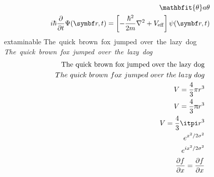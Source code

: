 \begin{align}
\ \mathbfit{\theta} a \theta \\
i\hbar\pdv t \Psi(\vec r, t) = \left[-\frac{\hbar^2}{2m}\nabla^2 + V_{\mathrm{eff}}\right]\psi(\vec r, t)
\end{align}
extaminable
The\ quick\ brown\ fox\ jumped\ over\ the\ lazy\ dog
\emph{The\ quick\ brown\ fox\ jumped\ over\ the\ lazy\ dog}
\begin{align}
\mathrm{The\ quick\ brown\ fox\ jumped\ over\ the\ lazy\ dog}\\
The\ quick\ brown\ fox\ jumped\ over\ the\ lazy\ dog\\
V = \frac43\pi r^3\\
V = \frac43\uppi r^3\\
V = \frac43\itpi r^3\\
e^{x^2/{2\sigma^2}}\\
e^{ i x^2/{2\sigma^2}}\\
\pdv{f}{x} = \frac{\partial f}{\partial x}
\end{align}


